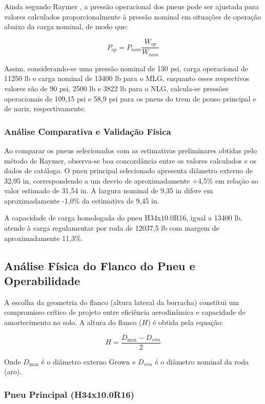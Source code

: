 Ainda segundo Raymer \cite{raymer2018}, a pressão operacional dos pneus pode ser ajustada para valores calculados proporcionalmente à pressão nominal em situações de operação abaixo da carga nominal, de modo que:

\begin{equation}
    P_{op}= P_{nom}\frac{W_{op}}{W_{nom}}
\end{equation}

Assim, considerando-se uma pressão nominal de 130 psi, carga operacional de 11250 lb e carga nominal de 13400 lb para o MLG, enquanto esses respectivos valores são de 90 psi, 2500 lb e 3822 lb para o NLG, calcula-se pressões operacionais de 109,15 psi e 58,9 psi para os pneus do trem de pouso principal e de nariz, respectivamente. 

\subsubsection{Análise Comparativa e Validação Física}
Ao comparar os pneus selecionados com as estimativas preliminares obtidas pelo método de Raymer, observa-se boa concordância entre os valores calculados e os dados de catálogo. O pneu principal selecionado apresenta diâmetro externo de 32,95 in, correspondendo a um desvio de aproximadamente +4,5\% em relação ao valor estimado de 31,54 in. A largura nominal de 9,35 in difere em aproximadamente -1,0\% da estimativa de 9,45 in.

A capacidade de carga homologada do pneu H34x10.0R16, igual a 13400 lb, atende à carga regulamentar por roda de 12037,5 lb com margem de aproximadamente 11,3\%.

\subsection{Análise Física do Flanco do Pneu e Operabilidade}

A escolha da geometria do flanco (altura lateral da borracha) constitui um compromisso crítico de projeto entre eficiência aerodinâmica e capacidade de amortecimento no solo. A altura do flanco ($H$) é obtida pela equação:

\begin{equation}
H = \frac{D_{\max} - D_{rim}}{2}
\end{equation}

Onde $D_{\max}$ é o diâmetro externo Grown e $D_{rim}$ é o diâmetro nominal da roda (aro).

\subsubsection*{Pneu Principal (H34x10.0R16)}

